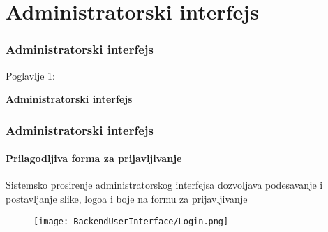 %

\section{Administratorski interfejs}
\begin{frame}[fragile]
	\frametitle{Administratorski interfejs}

	\begin{center}\huge{Poglavlje 1:}\end{center}
	\begin{center}\huge{\color{typo3darkgrey}\textbf{Administratorski interfejs}}\end{center}

\end{frame}

\begin{frame}[fragile]
	\frametitle{Administratorski interfejs}
	\framesubtitle{Prilagodljiva forma za prijavljivanje}

	Sistemsko prosirenje administratorskog interfejsa dozvoljava podesavanje i postavljanje slike, logoa i boje na formu za prijavljivanje

	\begin{figure}
		\texttt{[image: BackendUserInterface/Login.png]}
	\end{figure}

\end{frame}

